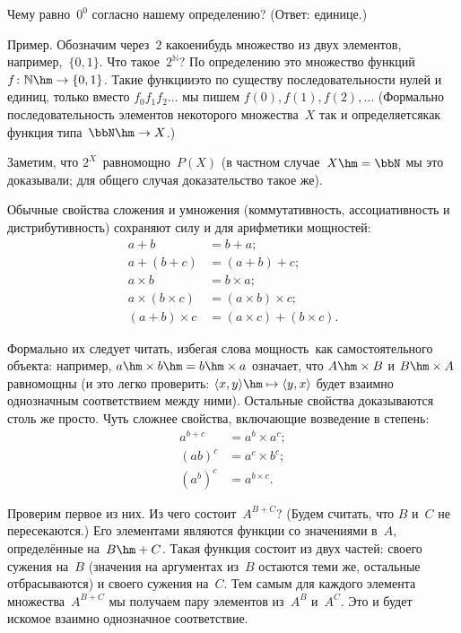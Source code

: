 \begin{problem}
Чему равно~$0^0$ согласно нашему определению?
(Ответ: единице.)
\end{problem}

\textsf{Пример.} Обозначим через~$2$ какое\д нибудь множество из двух
элементов, например,~$\{0,1\}$. Что такое~$2^\mathbb{N}$? По
определению это множество функций $f\colon\mathbb{N}\hm\to\{0,1\}$.
Такие функции\т это по существу последовательности нулей и
единиц, только вместо
$f_0f_1f_2\dots$
мы пишем
$f(0), f(1), f(2), \dots$
(Формально последовательность элементов
некоторого множества~$X$ так и определяется\т как функция
типа~$\bbN\hm\to X$.)

Заметим, что $2^X$~равномощно~$P(X)$ (в частном случае~$X\hm=\bbN$
мы это доказывали; для общего случая доказательство такое же).

Обычные свойства сложения и умножения (коммутативность, ассоциативность и
дистрибутивность)
сохраняют силу
и для арифметики мощностей:
\begin{align*}
 a+b&= b+a;\\
a+(b+c)&=(a+b)+c;\\
a\times b&= b\times a;\\
a\times (b \times c)&= (a\times b)\times c;\\
(a+b)\times c&= (a\times c)+(b \times c).
\end{align*}

Формально их следует читать, избегая слова  мощность\
как самостоятельного объекта: например, $a\hm\times b\hm=b\hm\times a$
означает, что $A\hm\times B$ и $B\hm\times A$ равномощны (и это легко
проверить: $\langle x,y\rangle \hm\mapsto \langle y,x\rangle$ будет
взаимно однозначным соответствием между ними). Остальные свойства
доказываются столь же просто. Чуть сложнее свойства,
включающие возведение в степень:
\begin{align*}
a^{b+c}&=a^b\times a^c;\\
(ab)^c&=a^c\times b^c;\\
(a^b)^c&=a^{b\times c}.
\end{align*}

Проверим первое из них. Из чего состоит~$A^{B+C}$? (Будем
считать, что $B$ и~$C$ не пересекаются.) Его элементами являются
функции со значениями в~$A$, определённые на~$B\hm+C$.
Такая функция состоит из двух частей: своего сужения на~$B$
(значения на аргументах из~$B$ остаются теми же, остальные
отбрасываются) и своего сужения на~$C$. Тем самым для каждого
элемента множества~$A^{B+C}$ мы получаем пару элементов из~$A^B$
и~$A^C$. Это и будет искомое взаимно однозначное
соответствие.

